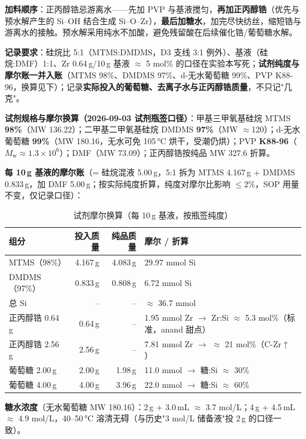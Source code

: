 \textbf{加料顺序}：正丙醇锆忌游离水——先加 PVP 与基液搅匀，\textbf{再加正丙醇锆}（优先与预水解产生的 Si--OH 结合生成 Si--O--Zr），\textbf{最后加糖水}，加完尽快纺丝，缩短锆与游离水的接触。预水解采用纯水不加酸，避免残留酸在后续催化锆/葡萄糖水解。

\textbf{记录要求}：硅烷比 5:1（MTMS:DMDMS，D3 支线 3:1 例外）、基液（硅烷:DMF）1:1、Zr 0.64\,g/10\,g 基液 $\approx$ 5 mol\% 的口径在实验本写死；\textbf{试剂纯度与摩尔账一并入账}（MTMS 98\%、DMDMS 97\%、d-无水葡萄糖 99\%、PVP K88-96，换算见下）；记录\textbf{实际投入的葡萄糖、去离子水与正丙醇锆质量}，不只记"几克"。

\textbf{试剂规格与摩尔换算（2026-09-03 试剂瓶签口径）}：甲基三甲氧基硅烷 MTMS \textbf{98\%}（MW 136.22）；二甲基二甲氧基硅烷 DMDMS \textbf{97\%}（MW $\approx$120）；d-无水葡萄糖 \textbf{99\%}（MW 180.16，无水可免 105\,°C 烘干，受潮仍烘）；PVP \textbf{K88-96}（$M_{\mathrm{w}}\approx1.3\times10^{6}$）；DMF（MW 73.09）；正丙醇锆按纯品 MW 327.6 折算。

\textbf{每 10\,g 基液的摩尔账}（= 硅烷混液 5.00\,g，5:1 拆为 MTMS 4.167\,g + DMDMS 0.833\,g，加 DMF 5.00\,g；按实际纯度折算，纯度对摩尔比影响 $\le$2\%，SOP 用量不变，仅记录口径）：

\begin{table}[htbp]
\centering
\caption{试剂摩尔换算（每 10\,g 基液，按瓶签纯度）}
\begin{tabularx}{\textwidth}{l r r X}
\toprule
组分 & 投入质量 & 纯品质量 & 摩尔 / 折算 \\
\midrule
MTMS（98\%） & 4.167\,g & 4.083\,g & 29.97 mmol Si \\
DMDMS（97\%） & 0.833\,g & 0.808\,g & 6.72 mmol Si \\
总 Si & -- & -- & $\approx$ 36.7 mmol \\
正丙醇锆 0.64\,g & 0.64\,g & -- & 1.95 mmol Zr $\rightarrow$ Zr:Si $\approx$ 5.3 mol\%（标准，anand 甜点） \\
正丙醇锆 2.56\,g & 2.56\,g & -- & 7.81 mmol Zr $\rightarrow$ $\approx$ 21 mol\%（C-Zr$\uparrow$） \\
葡萄糖 2.00\,g & 2.00\,g & 1.98\,g & 11.0 mmol $\rightarrow$ 糖:Si $\approx$ 30\% \\
葡萄糖 4.00\,g & 4.00\,g & 3.96\,g & 22.0 mmol $\rightarrow$ 糖:Si $\approx$ 60\% \\
\bottomrule
\end{tabularx}
\end{table}

\textbf{糖水浓度}（无水葡萄糖 MW 180.16）：2\,g + 3.0\,mL $\approx$ 3.7 mol/L；4\,g + 4.5\,mL $\approx$ 4.9 mol/L，40--50\,°C 溶清无碍（与历史"3 mol/L 储备液"投 2\,g 的口径一致）。

